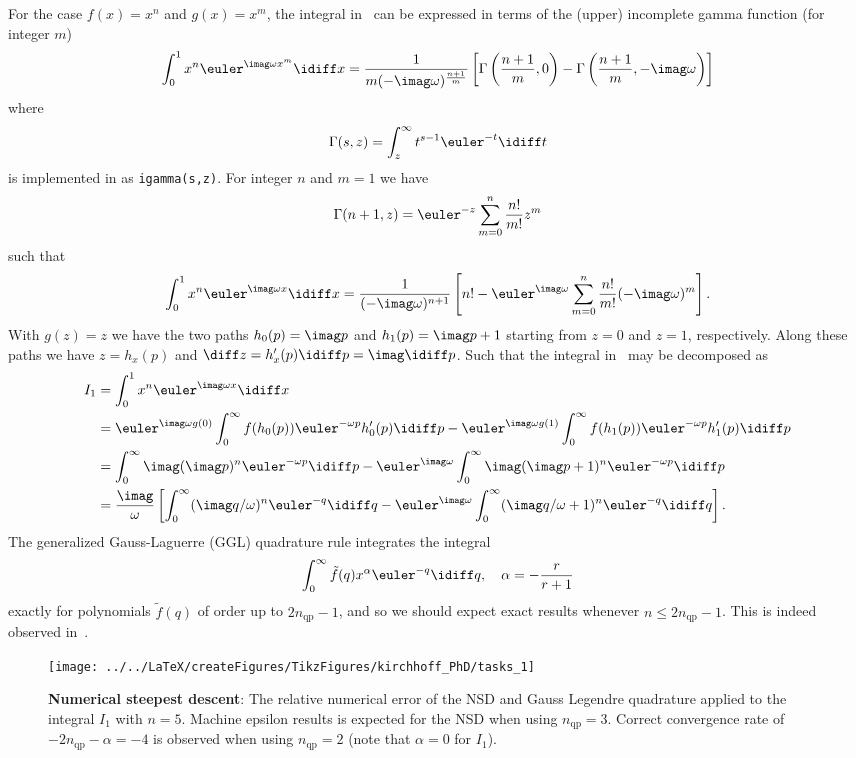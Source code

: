 For the case $f(x) = x^n$ and $g(x)=x^m$, the integral in~ can be expressed in terms of the (upper) incomplete gamma function (for integer $m$)
\begin{equation*}
	\int_0^1 x^n \euler^{\imag \omega x^m}\idiff x = \frac{1}{m(-\imag\omega)^{\frac{n+1}{m}}}\left[\Gamma\left(\frac{n+1}{m},0\right)-\Gamma\left(\frac{n+1}{m},-\imag\omega\right)\right]
\end{equation*}
where
\begin{equation*}
	\Gamma(s,z) = \int_z^\infty t^{s-1}\euler^{-t}\idiff t
\end{equation*}
is implemented in \MATLAB as \verb|igamma(s,z)|. For integer $n$ and $m=1$ we have
\begin{equation*}
	\Gamma(n+1,z) = \euler^{-z}\sum_{m=0}^n\frac{n!}{m!}z^m
\end{equation*}
such that
\begin{equation*}
	\int_0^1 x^n \euler^{\imag \omega x}\idiff x = \frac{1}{(-\imag \omega)^{n+1}}\left[n! -  \euler^{\imag \omega}\sum_{m=0}^n \frac{n!}{m!}(-\imag \omega)^m\right].
\end{equation*}
With $g(z) = z$ we have the two paths $h_0(p) = \imag p$ and $h_1(p) = \imag p+1$ starting from $z=0$ and $z=1$, respectively. Along these paths we have $z=h_x(p)$ and $\diff z=h_x'(p)\idiff p=\imag\idiff p$. Such that the integral in~ may be decomposed as
\begin{align*}
	I_1 &= \int_0^1 x^n \euler^{\imag \omega x}\idiff x \\
	  &= \euler^{\imag\omega g(0)}\int_0^\infty f(h_0(p))\euler^{-\omega p}h_0'(p)\idiff p - \euler^{\imag\omega g(1)}\int_0^\infty f(h_1(p))\euler^{-\omega p}h_1'(p)\idiff p\\
	  &= \int_0^\infty \imag(\imag p)^n\euler^{-\omega p}\idiff p - \euler^{\imag\omega}\int_0^\infty \imag(\imag p+1)^n\euler^{-\omega p}\idiff p\\
	  &= \frac{\imag}{\omega}\left[\int_0^\infty (\imag q/\omega)^n\euler^{-q}\idiff q - \euler^{\imag\omega}\int_0^\infty (\imag q/\omega+1)^n\euler^{-q}\idiff q\right].
\end{align*}
The generalized Gauss-Laguerre (GGL) quadrature rule integrates the integral
\begin{equation*}
	\int_0^\infty \tilde{f}(q)x^\alpha\euler^{-q}\idiff q,\quad \alpha = -\frac{r}{r+1}
\end{equation*}
exactly for polynomials $\tilde{f}(q)$ of order up to $2n_{\mathrm{qp}}-1$, and so we should expect exact results whenever $n\leq 2n_{\mathrm{qp}}-1$. This is indeed observed in~.
\begin{figure}
	\centering
	\texttt{[image: ../../LaTeX/createFigures/TikzFigures/kirchhoff\_PhD/tasks\_1]}
	\caption{\textbf{Numerical steepest descent}: The relative numerical error of the NSD and Gauss Legendre quadrature applied to the integral $I_1$ with $n=5$. Machine epsilon results is expected for the NSD when using $n_{\mathrm{qp}}=3$. Correct convergence rate of $-2n_{\mathrm{qp}}-\alpha=-4$ is observed when using $n_{\mathrm{qp}}=2$ (note that $\alpha=0$ for $I_1$).}
	\label{Fig4:tasks_1}
\end{figure}


